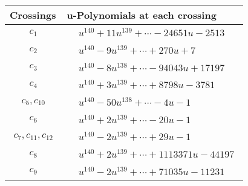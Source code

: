 \documentclass[1p]{elsarticle_modified}
\theoremstyle{definition}
\begin{document}
\begin{tabular}{m{50pt}|m{274pt}}
Crossings & \hspace{64pt}u-Polynomials at each crossing \\
\hline $$\begin{aligned}c_{1}\end{aligned}$$&$\begin{aligned}
&u^{140}+11 u^{139}+\cdots-24651 u-2513
\end{aligned}$\\
\hline $$\begin{aligned}c_{2}\end{aligned}$$&$\begin{aligned}
&u^{140}-9 u^{139}+\cdots+270 u+7
\end{aligned}$\\
\hline $$\begin{aligned}c_{3}\end{aligned}$$&$\begin{aligned}
&u^{140}-8 u^{138}+\cdots-94043 u+17197
\end{aligned}$\\
\hline $$\begin{aligned}c_{4}\end{aligned}$$&$\begin{aligned}
&u^{140}+3 u^{139}+\cdots+8798 u-3781
\end{aligned}$\\
\hline $$\begin{aligned}c_{5},c_{10}\end{aligned}$$&$\begin{aligned}
&u^{140}-50 u^{138}+\cdots-4 u-1
\end{aligned}$\\
\hline $$\begin{aligned}c_{6}\end{aligned}$$&$\begin{aligned}
&u^{140}+2 u^{139}+\cdots-20 u-1
\end{aligned}$\\
\hline $$\begin{aligned}c_{7},c_{11},c_{12}\end{aligned}$$&$\begin{aligned}
&u^{140}-2 u^{139}+\cdots+29 u-1
\end{aligned}$\\
\hline $$\begin{aligned}c_{8}\end{aligned}$$&$\begin{aligned}
&u^{140}+2 u^{139}+\cdots+1113371 u-44197
\end{aligned}$\\
\hline $$\begin{aligned}c_{9}\end{aligned}$$&$\begin{aligned}
&u^{140}-2 u^{139}+\cdots+71035 u-11231
\end{aligned}$\\
\hline
\end{tabular}\\~\\
\end{document}
